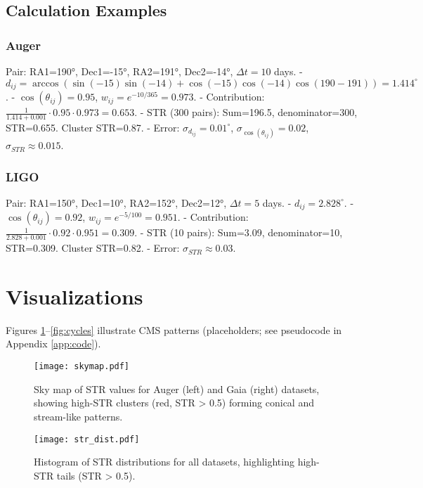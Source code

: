 \documentclass[12pt, twocolumn]{article}
\begin{document}
\subsection{Calculation Examples}
\subsubsection{Auger}
Pair: RA1=190°, Dec1=-15°, RA2=191°, Dec2=-14°, $\Delta t=10$ days.
- \(d_{ij} = \arccos(\sin(-15) \sin(-14) + \cos(-15) \cos(-14) \cos(190-191)) = 1.414^\circ\).
- \(\cos(\theta_{ij}) = 0.95\), \(w_{ij} = e^{-10/365} = 0.973\).
- Contribution: \(\frac{1}{1.414 + 0.001} \cdot 0.95 \cdot 0.973 = 0.653\).
- STR (300 pairs): Sum=196.5, denominator=300, STR=0.655. Cluster STR=0.87.
- Error: \(\sigma_{d_{ij}} = 0.01^\circ\), \(\sigma_{\cos(\theta_{ij})} = 0.02\), \(\sigma_{STR} \approx 0.015\).

\subsubsection{LIGO}
Pair: RA1=150°, Dec1=10°, RA2=152°, Dec2=12°, $\Delta t=5$ days.
- \(d_{ij} = 2.828^\circ\).
- \(\cos(\theta_{ij}) = 0.92\), \(w_{ij} = e^{-5/100} = 0.951\).
- Contribution: \(\frac{1}{2.828 + 0.001} \cdot 0.92 \cdot 0.951 = 0.309\).
- STR (10 pairs): Sum=3.09, denominator=10, STR=0.309. Cluster STR=0.82.
- Error: \(\sigma_{STR} \approx 0.03\).

\section{Visualizations}
\label{sec:visuals}
Figures \ref{fig:skymap}–\ref{fig:cycles} illustrate CMS patterns (placeholders; see pseudocode in Appendix \ref{app:code}).

\begin{figure}
    \centering
    \texttt{[image: skymap.pdf]}
    \caption{Sky map of STR values for Auger (left) and Gaia (right) datasets, showing high-STR clusters (red, STR > 0.5) forming conical and stream-like patterns. \lipsum[1][1-2]}
    \label{fig:skymap}
\end{figure}

\begin{figure}
    \centering
    \texttt{[image: str\_dist.pdf]}
    \caption{Histogram of STR distributions for all datasets, highlighting high-STR tails (STR > 0.5). \lipsum[1][1-2]}
    \label{fig:str_dist}
\end{figure}
\end{document}
